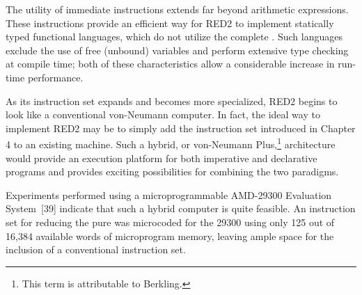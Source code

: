 The utility of immediate instructions extends far beyond arithmetic expressions.
These instructions provide an efficient way for RED2 to implement statically
typed functional languages, which do not utilize the complete
\lambdacalculus{}. Such languages exclude the use of free (unbound) variables
and perform extensive type checking at compile time; both of these
characteristics allow a considerable increase in run-time performance.

As its instruction set expands and becomes more specialized, RED2 begins to look
like a conventional von-Neumann computer. In fact, the ideal way to implement
RED2 may be to simply add the instruction set introduced in Chapter 4 to an
existing machine. Such a hybrid, or von-Neumann Plus,\footnote{This term is
attributable to Berkling.} architecture would provide an execution platform for
both imperative and declarative programs and provides exciting possibilities for
combining the two paradigms.

Experiments performed using a microprogrammable AMD-29300 Evaluation System~[39]
indicate that such a hybrid computer is quite feasible. An instruction set for
reducing the pure \lambdacalculus{} was microcoded for the 29300 using only 125
out of 16,384 available words of microprogram memory, leaving ample space for
the inclusion of a conventional instruction set.
